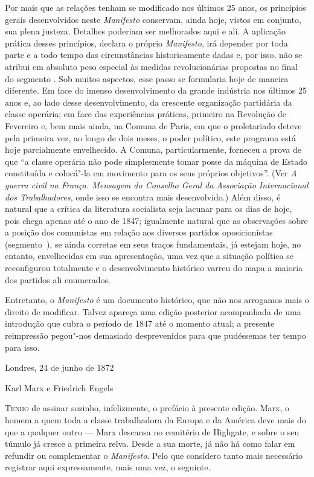 Por mais que as relações tenham se modificado nos últimos 25
anos, os princípios gerais desenvolvidos neste \textit{Manifesto}
conservam, ainda hoje, vistos em conjunto, sua plena justeza. Detalhes
poderiam ser melhorados aqui e ali. A aplicação prática desses
princípios, declara o próprio \textit{Manifesto}, irá depender por toda
parte e a todo tempo das circunstâncias historicamente dadas e, por
isso, não se atribui em absoluto peso especial às medidas
revolucionárias propostas no final do segmento . Sob muitos aspectos,
esse passo se formularia hoje de maneira diferente. Em face do imenso
desenvolvimento da grande indústria nos últimos 25 anos e,
ao lado desse desenvolvimento, da crescente organização partidária da
classe operária; em face das experiências práticas, primeiro na
Revolução de Fevereiro e, bem mais ainda, na Comuna de Paris, em que o
proletariado deteve pela primeira vez, ao longo de dois meses, o poder
político, este programa está hoje parcialmente envelhecido. A Comuna,
particularmente, forneceu a prova de que “a classe operária não pode
simplesmente tomar posse da máquina de Estado constituída e colocá"-la
em movimento para os seus próprios objetivos”. (Ver \textit{A guerra
civil na França. Mensagem do Conselho Geral da Associação Internacional
dos Trabalhadores}, onde isso se encontra mais
desenvolvido.) Além disso, é natural que a crítica da literatura
socialista seja lacunar para os dias de hoje, pois chega apenas até o
ano de 1847; igualmente natural que as observações sobre a posição dos
comunistas em relação aos diversos partidos oposicionistas (\mbox{segmento }),
se ainda corretas em seus traços fundamentais, já estejam hoje, no entanto, envelhecidas em sua apresentação, uma vez que a situação
política se reconfigurou totalmente e o desenvolvimento histórico
varreu do mapa a maioria dos partidos ali enumerados.

Entretanto, o \textit{Manifesto} é um documento histórico, que não nos
arrogamos mais o direito de modificar. Talvez apareça uma edição
posterior acompanhada de uma introdução que cubra o período de 1847 até
o momento atual; a presente reimpressão pegou"-nos demasiado
desprevenidos para que pudéssemos ter tempo para isso.
\smallskip

\hfill Londres, 24 de junho de 1872

\hfill Karl Marx e Friedrich Engels


\textsc{Tenho} de assinar sozinho, infelizmente, o prefácio à presente edição.
Marx, o homem a quem toda a classe trabalhadora da Europa e da América
deve mais do que a qualquer outro  ---  Marx descansa no cemitério de
Highgate, e sobre o seu túmulo já cresce a primeira relva. Desde a sua
morte, já não há como falar em refundir ou complementar o
\textit{Manifesto}. Pelo que considero tanto mais necessário registrar
aqui expressamente, mais uma vez, o seguinte.

